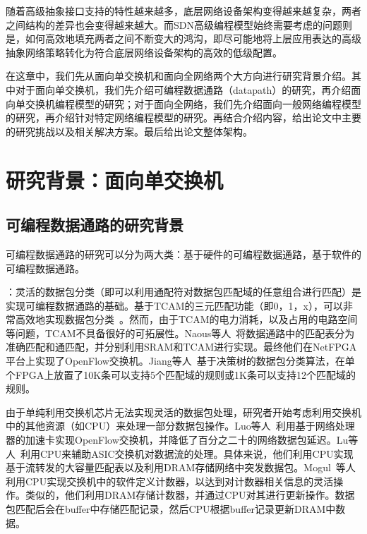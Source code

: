 随着高级抽象接口支持的特性越来越多，底层网络设备架构变得越来越复杂，两者之间结构的差异也会变得越来越大。而SDN高级编程模型始终需要考虑的问题则是，如何高效地填充两者之间不断变大的鸿沟，即尽可能地将上层应用表达的高级抽象网络策略转化为符合底层网络设备架构的高效的低级配置。

在这章中，我们先从面向单交换机和面向全网络两个大方向进行研究背景介绍。其中对于面向单交换机，我们先介绍可编程数据通路（datapath）的研究，再介绍面向单交换机编程模型的研究；对于面向全网络，我们先介绍面向一般网络编程模型的研究，再介绍针对特定网络编程模型的研究。再结合介绍内容，给出论文中主要的研究挑战以及相关解决方案。最后给出论文整体架构。


\section{研究背景：面向单交换机}

\subsection{可编程数据通路的研究背景}

可编程数据通路的研究可以分为两大类：基于硬件的可编程数据通路，基于软件的可编程数据通路。

：灵活的数据包分类（即可以利用通配符对数据包匹配域的任意组合进行匹配）是实现可编程数据通路的基础。基于TCAM的三元匹配功能（即0，1，x），可以非常高效地实现数据包分类~\cite{yu2005efficient,lakshminarayanan2005algorithms,song2005efficient}。然而，由于TCAM的电力消耗，以及占用的电路空间等问题，TCAM不具备很好的可拓展性。Naous等人~\cite{naous2008implementing}将数据通路中的匹配表分为准确匹配和通匹配，并分别利用SRAM和TCAM进行实现。最终他们在NetFPGA平台上实现了OpenFlow交换机。Jiang等人~\cite{jiang2011scalable}基于决策树的数据包分类算法，在单个FPGA上放置了10K条可以支持5个匹配域的规则或1K条可以支持12个匹配域的规则。

由于单纯利用交换机芯片无法实现灵活的数据包处理，研究者开始考虑利用交换机中的其他资源（如CPU）来处理一部分数据包操作。Luo等人~\cite{luo2009accelerating}利用基于网络处理器的加速卡实现OpenFlow交换机，并降低了百分之二十的网络数据包延迟。Lu等人~\cite{lu2012using}利用CPU来辅助ASIC交换机对数据流的处理。具体来说，他们利用CPU实现基于流转发的大容量匹配表以及利用DRAM存储网络中突发数据包。Mogul~\cite{mogul2012hey}等人利用CPU实现交换机中的软件定义计数器，以达到对计数器相关信息的灵活操作。类似的，他们利用DRAM存储计数器，并通过CPU对其进行更新操作。数据包匹配后会在buffer中存储匹配记录，然后CPU根据buffer记录更新DRAM中数据。

